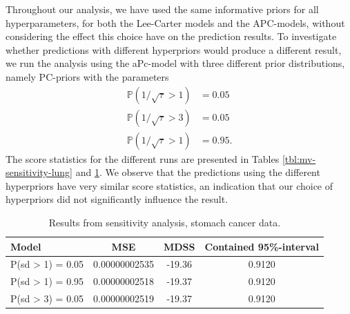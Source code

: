 Throughout our analysis, we have used the same informative priors for all hyperparameters, for both the Lee-Carter models and the APC-models, without considering the effect this choice have on the prediction results. To investigate whether predictions with different hyperpriors would produce a different result, we run the analysis using the aPc-model with three different prior distributions, namely PC-priors with the parameters
\begin{equation}
    \begin{aligned}
        \mathbb{P}(1/\sqrt{\tau} > 1) & = 0.05 \\
        \mathbb{P}(1/\sqrt{\tau} > 3) & = 0.05 \\
        \mathbb{P}(1/\sqrt{\tau} > 1) & = 0.95.
    \end{aligned}
\end{equation}
The score statistics for the different runs are presented in Tables \ref{tbl:mv-sensitivity-lung} and \ref{tbl:mv-sensitivity-stomach}. We observe that the predictions using the different hyperpriors have very similar score statistics, an indication that our choice of hyperpriors did not significantly influence the result. 


\begin{table}
    \begin{center}
        \begin{tabular}{l |c c c }
        Model & MSE &   MDSS & Contained 95\%-interval\\
        \hline
        P(sd > 1) = 0.05 & 0.00000002535 & -19.36    & 0.9120\\
        P(sd > 1) = 0.95 & 0.00000002518 & -19.37    & 0.9120\\
        P(sd > 3) = 0.05 & 0.00000002519 & -19.37    & 0.9120\\
        \end{tabular}
    \caption{Results from sensitivity analysis, stomach cancer data.}\label{tbl:mv-sensitivity-stomach}
    \end{center}
\end{table}

